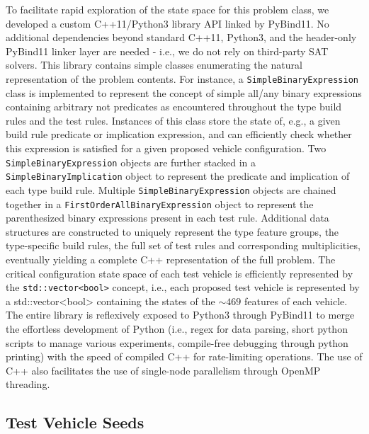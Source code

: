 \documentclass[aps,prl,twocolumn,superscriptaddress,groupedaddress]{revtex4}  %
\begin{document}
To facilitate rapid exploration of the state space for this problem class, we
developed a custom C++11/Python3 library API linked by PyBind11. No additional
dependencies beyond standard C++11, Python3, and the header-only PyBind11 linker
layer are needed - i.e., we do not rely on third-party SAT solvers. This library
contains simple classes enumerating the natural representation of the problem
contents. For instance, a \texttt{SimpleBinaryExpression} class is implemented
to represent the concept of simple all/any binary expressions containing
arbitrary not predicates as encountered throughout the type build rules and the
test rules. Instances of this class store the state of, e.g., a given build rule
predicate or implication expression, and can efficiently check whether this
expression is satisfied for a given proposed vehicle configuration. Two
\texttt{SimpleBinaryExpression} objects are further stacked in a
\texttt{SimpleBinaryImplication} object to represent the predicate and
implication of each type build rule. Multiple \texttt{SimpleBinaryExpression}
objects are chained together in a \texttt{FirstOrderAllBinaryExpression} object
to represent the parenthesized binary expressions present in each test rule.
Additional data structures are constructed to uniquely represent the type
feature groups, the type-specific build rules, the full set of test rules and
corresponding multiplicities, eventually yielding a complete C++ representation
of the full problem. The critical configuration state space of each test vehicle
is efficiently represented by the \texttt{std::vector<bool>} concept, i.e., each
proposed test vehicle is represented by a std::vector<bool> containing the
states of the $\sim 469$ features of each vehicle.
 The entire library is reflexively exposed to Python3 through PyBind11 to merge
the effortless development of Python (i.e., regex for data parsing, short python
scripts to manage various experiments, compile-free debugging through python
printing) with the speed of compiled C++ for rate-limiting operations. The use
of C++ also facilitates the use of single-node parallelism through OpenMP
threading.

\subsection{Test Vehicle Seeds}
\end{document}
